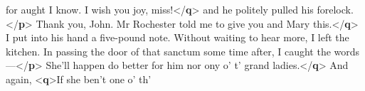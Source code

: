 \documentclass[11pt,twoside]{article}\makeatletter
\begin{document}
\begin{shaded}
\hspace*{1em}\hspace*{1em}\hspace*{1em}\hspace*{1em} for aught I know. I wish you joy, miss!{</\textbf{q}>} and he politely\mbox{}\newline 
\hspace*{1em}\hspace*{1em} pulled his forelock.{</\textbf{p}>}\mbox{}\newline 
{}\mbox{}\newline 
\hspace*{1em}Thank you, John. Mr Rochester told me to give you and\mbox{}\newline 
\hspace*{1em}\hspace*{1em}\hspace*{1em}\hspace*{1em} Mary this.{</\textbf{q}>}\mbox{}\newline 
{}\mbox{}\newline 
{}I put into his hand a five-pound note. Without waiting\mbox{}\newline 
\hspace*{1em}\hspace*{1em} to hear more, I left the kitchen. In passing the door of\mbox{}\newline 
\hspace*{1em}\hspace*{1em} that sanctum some time after, I caught the words —{</\textbf{p}>}\mbox{}\newline 
{}\mbox{}\newline 
\hspace*{1em}She'll happen do better for him nor ony o' t' grand\mbox{}\newline 
\hspace*{1em}\hspace*{1em}\hspace*{1em}\hspace*{1em} ladies.{</\textbf{q}>} And again, {<\textbf{q}>}If she ben't one o' th'\mbox{}\newline 

\end{shaded}
\end{document}
